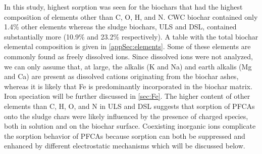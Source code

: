 In this study, highest sorption was seen for the biochars that had the highest composition of elements other than C, O, H, and N. CWC biochar contained only 1.4\% other elements whereas the sludge biochars, ULS and DSL, contained substantially more (10.9\% and 23.2\% respectively). A table with the total biochar elemental composition is given in \cref{appSec:elements}. Some of these elements are commonly found as freely dissolved ions. Since dissolved ions were not analyzed, we can only assume that, at large, the alkalis (K and Na) and earth alkalis (Mg and Ca) are present as dissolved cations originating from the biochar ashes, whereas it is likely that Fe is predominantly incorporated in the biochar matrix. Iron speciation will be further discussed in \cref{sec:Fe}. The higher content of other elements than C, H, O, and N in ULS and DSL suggests that sorption of PFCAs onto the sludge chars were likely influenced by the presence of charged species, both in solution and on the biochar surface. Coexisting inorganic ions complicate the sorption behavior of PFCAs because sorption can both be suppressed and enhanced by different electrostatic mechanisms \citep{du2014adsorption} which will be discussed below. 

